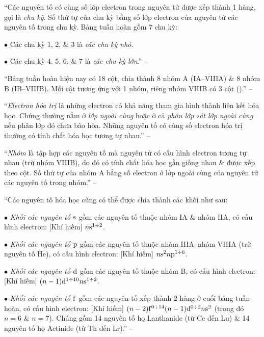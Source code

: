 \documentclass[oneside]{book}
\numberwithin{equation}{section}
\begin{document}
``Các nguyên tố có cùng số lớp electron trong nguyên tử được xếp thành 1 hàng, gọi là \textit{chu kỳ}. Số thứ tự của chu kỳ bằng số lớp electron của nguyên tử các nguyên tố trong chu kỳ. Bảng tuần hoàn gồm 7 chu kỳ: 
\begin{enumerate*}
	\item[$\bullet$] Các chu kỳ 1, 2, \& 3 là \textit{các chu kỳ nhỏ}.
	\item[$\bullet$] Các chu kỳ 4, 5, 6, \& 7 là \textit{các chu kỳ lớn}.'' -- \cite[p. 38]{SGK_Hoa_Hoc_10_Chan_Troi_Sang_Tao}
\end{enumerate*}

``Bảng tuần hoàn hiện nay có 18 cột, chia thành 8 nhóm A (IA--VIIIA) \& 8 nhóm B (IB--VIIIB). Mỗi cột tương ứng với 1 nhóm, riêng nhóm VIIIB có 3 cột (\cite[Hình 5.2: \textsf{Bảng tuần hoàn các nguyên tố hóa học}, p. 38]{SGK_Hoa_Hoc_10_Chan_Troi_Sang_Tao}).'' -- \cite[p. 38]{SGK_Hoa_Hoc_10_Chan_Troi_Sang_Tao}

``\textit{Electron hóa trị} là những electron có khả năng tham gia hình thành liên kết hóa học. Chúng thường nằm ở \textit{lớp ngoài cùng} hoặc ở cả \textit{phân lớp sát lớp ngoài cùng} nếu phân lớp đó chưa bão hòa. Những nguyên tố có cùng số electron hóa trị thường có tính chất hóa học tương tự nhau.'' -- \cite[p. 39]{SGK_Hoa_Hoc_10_Chan_Troi_Sang_Tao}

``\textit{Nhóm} là tập hợp các nguyên tố mà nguyên tử có cấu hình electron tương tự nhau (trừ nhóm VIIIB), do đó có tính chất hóa học gần giống nhau \& được xếp theo cột. Số thứ tự của nhóm A bằng số electron ở lớp ngoài cùng của nguyên tử các nguyên tố trong nhóm.'' -- \cite[p. 39]{SGK_Hoa_Hoc_10_Chan_Troi_Sang_Tao}

``Các nguyên tố hóa học cũng có thể được chia thành các khối như sau:
\begin{enumerate*}
	\item[$\bullet$] \textit{Khối các nguyên tố $\rm s$} gồm các nguyên tố thuộc nhóm IA \& nhóm IIA, có cấu hình electron: [Khí hiếm] $n{\rm s}^{1\div 2}$.
	\item[$\bullet$] \textit{Khối các nguyên tố $\rm p$} gồm các nguyên tố thuộc nhóm IIIA--nhóm VIIIA (trừ nguyên tố He), có cấu hình electron: [Khí hiếm] $n{\rm s}^2n{\rm p}^{1\div 6}$.
	\item[$\bullet$] \textit{Khối các nguyên tố $\rm d$} gồm các nguyên tố thuộc nhóm B, có cấu hình electron: [Khí hiếm] $(n - 1){\rm d}^{1\div 10}n{\rm s}^{1\div 2}$.
	\item[$\bullet$] \textit{Khối các nguyên tố $\rm f$} gồm các nguyên tố xếp thành 2 hàng ở cuối bảng tuần hoàn, có cấu hình electron: [Khí hiếm] $(n - 2){\rm f}^{0\div 14}(n - 1){\rm d}^{0\div 2}n{\rm s}^2$ (trong đó $n = 6$  \& $n = 7$). Chúng gồm 14 nguyên tố họ Lanthanide (từ Ce đến Lu) \& 14 nguyên tố họ Actinide (từ Th đến Lr).'' -- \cite[pp. 39--40]{SGK_Hoa_Hoc_10_Chan_Troi_Sang_Tao}
\end{enumerate*}
\end{document}
